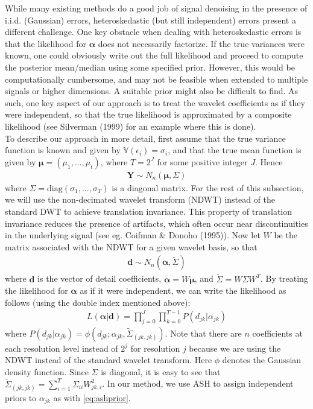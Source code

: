 \documentclass[12pt]{article}
\newcommand{\Ga}{\alpha}
\newcommand{\Ge}{\epsilon}
\newcommand{\s}{\sigma}
\begin{document}
While many existing methods do a good job of signal denoising in the presence of i.i.d. (Gaussian) errors, heteroskedastic (but still independent) errors present a different challenge. One key obstacle when dealing with heteroskedastic errors is that the likelihood for $\bm{\Ga}$ does not necessarily factorize. If the true variances were known, one could obviously write out the full likelihood and proceed to compute the posterior mean/median using some specified prior. However, this would be computationally cumbersome, and may not be feasible when extended to multiple signals or higher dimensions. A suitable prior might also be difficult to find. As such, one key aspect of our approach is to treat the wavelet coefficients as if they were independent, so that the true likelihood is approximated by a composite likelihood (see Silverman (1999) for an example where this is done).\bigskip\\
To describe our approach in more detail, first assume that the true variance function is known and given by $\mathbb{V}(\Ge_i)=\s_i$, and that the true mean function is given by $\bm{\mu}=(\mu_1,...,\mu_t)$, where $T=2^J$ for some positive integer $J$. Hence
\begin{eqnarray}
\bm{Y}\sim N_n(\bm{\mu},\Sigma)
\end{eqnarray}
where $\Sigma=\textrm{diag}(\s_1,...,\s_T)$ is a diagonal matrix. For the rest of this subsection, we will use the non-decimated wavelet transform (NDWT) instead of the standard DWT to achieve translation invariance. This property of translation invariance reduces the presence of artifacts, which often occur near discontinuities in the underlying signal (see eg. Coifman \& Donoho (1995)). Now let $W$ be the matrix associated with the NDWT for a given wavelet basis, so that
\begin{eqnarray}
\bm{d}\sim N_n(\bm{\Ga},\tilde{\Sigma})
\end{eqnarray}
where $\bm{d}$ is the vector of detail coefficients, $\bm{\Ga}=W\bm{\mu}$, and $\tilde{\Sigma}=W\Sigma W^T$. By treating the likelihood for $\bm{\Ga}$ as if it were independent, we can write the likelihood as follows (using the double index mentioned above):
\begin{eqnarray}\label{eq:likelihood}
L(\bm{\Ga}|\bm{d})=\prod_{j=0}^J\prod_{k=0}^{T-1}P(d_{jk}|\Ga_{jk})
\end{eqnarray}
where $P(d_{jk}|\Ga_{jk})=\phi(d_{jk};\Ga_{jk},\tilde{\Sigma}_{(jk,jk)})$. Note that there are $n$ coefficients at each resolution level instead of $2^j$ for resolution $j$ because we are using the NDWT instead of the standard wavelet transform. Here $\phi$ denotes the Gaussian density function. Since $\Sigma$ is diagonal, it is easy to see that $\tilde{\Sigma}_{(jk,jk)}=\sum_{i=1}^T \Sigma_{ii}W_{jk,i}^2$. In our method, we use ASH to assign independent priors to $\Ga_{jk}$ as with \eqref{eq:ashprior}. %
\end{document}
